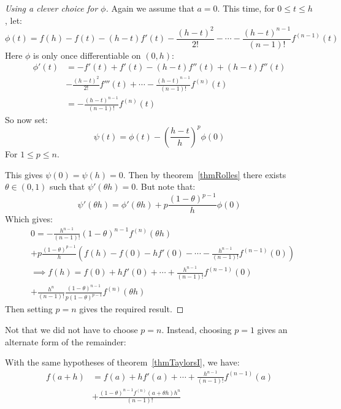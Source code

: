 \documentclass[../Main.tex]{subfiles}
\begin{document}
\begin{proof}[Using a clever choice for $\phi$]
    Again we assume that $a = 0$. This time, for $0 \leq t \leq h$, let:
    \begin{equation*}
        \phi(t) = f(h) - f(t) - (h - t)f'(t) - \frac{(h - t)^2}{2!} - \cdots - \frac{(h - t)^{n-1}}{(n-1)!} f^{(n-1)}(t)
    \end{equation*}
    Here $\phi$ is only once differentiable on $(0, h)$:
    \begin{align*}
        \phi'(t) &= -f'(t) + f'(t) - (h - t)f''(t) + (h - t)f''(t)\\
        &- \frac{(h - t)^2}{2!} f'''(t) + \cdots - \frac{(h - t)^{n - 1}}{(n-1)!} f^{(n)}(t) \\
        &= -\frac{(h-t)^{n-1}}{(n-1)!} f^{(n)}(t)
    \end{align*}
    So now set:
    \begin{equation*}
        \psi(t) = \phi(t) - \left(\frac{h - t}{h}\right)^p \phi(0)
    \end{equation*}
    For $1 \leq p \leq n$.\par
    This gives $\psi(0) = \psi(h) = 0$. Then by theorem~\ref{thmRolles} there exists $\theta \in (0, 1)$ such that $\psi'(\theta h) = 0$. But note that:
    \begin{equation*}
        \psi'(\theta h) = \phi'(\theta h) + p \frac{(1 - \theta)^{p-1}}{h} \phi(0)
    \end{equation*}
    Which gives:
    \begin{align*}
        &0 = - \frac{h^{n-1}}{(n-1)!}(1 - \theta)^{n-1} f^{(n)} (\theta h) \\
        &+ p \frac{(1 - \theta)^{p-1}}{h} \left(f(h) - f(0) - hf'(0) - \cdots - \frac{h^{n-1}}{(n-1)!}f^{(n-1)}(0)\right) \\
        &\implies f(h) = f(0) + hf'(0) + \cdots + \frac{h^{n-1}}{(n-1)!}f^{(n-1)}(0)\\
        &+ \frac{h^n}{(n-1)!} \frac{(1 - \theta)^{n-1}}{p(1-\theta)^{p-1}} f^{(n)} (\theta h)
    \end{align*}
    Then setting $p = n$ gives the required result.
\end{proof}
\begin{remark}
    Not that we did not have to choose $p = n$. Instead, choosing $p = 1$ gives an alternate form of the remainder:
\end{remark}
\begin{theorem}
    With the same hypotheses of theorem~\ref{thmTaylorsI}, we have:
    \begin{align*}
        f(a + h) &= f(a) + hf'(a) + \cdots + \frac{h^{n-1}}{(n-1)!} f^{(n-1)}(a) \\
        &+ \frac{(1 - \theta)^{n-1} f^{(n)} (a + \theta h) h^n}{(n - 1)!}
    \end{align*}
    \label{thmTaylorsII}
\end{theorem}
\end{document}
